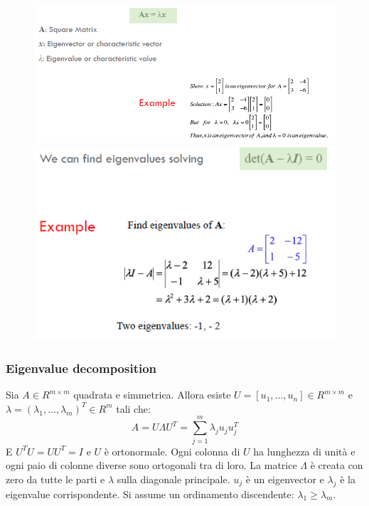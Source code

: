 \begin{figure}
	\centering
	\begin{minipage}{.6\textwidth}
		\centering
		\includegraphics[width=1\linewidth]{imgs/chapter12/img3}
		\caption{}
		\label{fig:chapter12-03}
	\end{minipage}%
	\begin{minipage}{.4\textwidth}
		\centering
		\includegraphics[width=1\linewidth]{imgs/chapter12/img4}
		\caption{}
		\label{fig:chapter12-04}
	\end{minipage}
\end{figure}

\subsubsection{Eigenvalue decomposition}
Sia $A\in R^{m\times m}$ quadrata e simmetrica.
Allora esiste $U=[u_1,\dots,u_n]\in R^{m\times m}$ e $\lambda=(\lambda_1,\dots,\lambda_m)^T\in R^m$ tali che:
$$A = U\Lambda U^T=\sum\limits_{j=1}^m\lambda_ju_ju_j^T$$
E $U^TU=UU^T=I$ e $U$ \`e ortonormale.
Ogni colonna di $U$ ha lunghezza di unit\`a e ogni paio di colonne diverse sono ortogonali tra di loro.
La matrice $\Lambda$ \`e creata con zero da tutte le parti e $\lambda$ sulla diagonale principale.
$u_j$ \`e un eigenvector e $\lambda_j$ \`e la eigenvalue corrispondente.
Si assume un ordinamento discendente: $\lambda_1\ge \lambda_m$.


